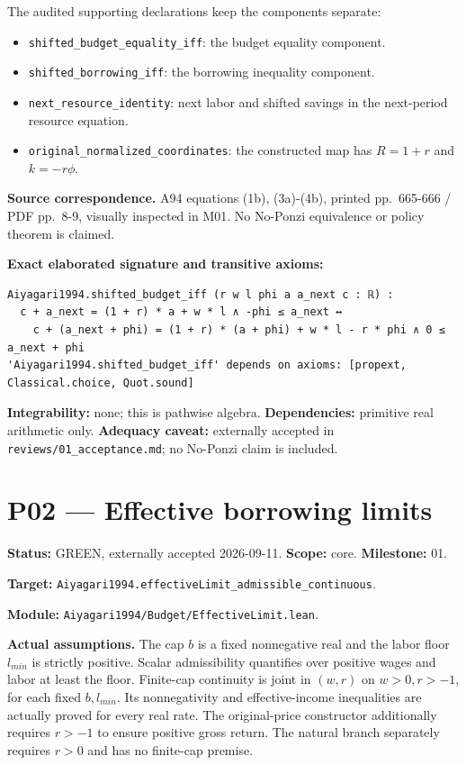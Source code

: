 \documentclass[
  11pt,
]{article}
\providecommand{\tightlist}{%
  \setlength{\itemsep}{0pt}\setlength{\parskip}{0pt}}
\let\LedgerOriginalTexttt\texttt
\renewcommand{\texttt}[1]{{\small\LedgerOriginalTexttt{#1}}}
\begin{document}
The audited supporting declarations keep the components separate:

\begin{itemize}
\tightlist
\item
  \texttt{shifted\_budget\_equality\_iff}: the budget equality
  component.
\item
  \texttt{shifted\_borrowing\_iff}: the borrowing inequality component.
\item
  \texttt{next\_resource\_identity}: next labor and shifted savings in
  the next-period resource equation.
\item
  \texttt{original\_normalized\_coordinates}: the constructed map has
  \(R=1+r\) and \(k=-r\phi\).
\end{itemize}

\textbf{Source correspondence.} A94 equations (1b), (3a)-(4b), printed
pp.~665-666 / PDF pp.~8-9, visually inspected in M01. No No-Ponzi
equivalence or policy theorem is claimed.

\textbf{Exact elaborated signature and transitive axioms:}

\begin{verbatim}
Aiyagari1994.shifted_budget_iff (r w l phi a a_next c : ℝ) :
  c + a_next = (1 + r) * a + w * l ∧ -phi ≤ a_next ↔
    c + (a_next + phi) = (1 + r) * (a + phi) + w * l - r * phi ∧ 0 ≤ a_next + phi
'Aiyagari1994.shifted_budget_iff' depends on axioms: [propext, Classical.choice, Quot.sound]
\end{verbatim}

\textbf{Integrability:} none; this is pathwise algebra.
\textbf{Dependencies:} primitive real arithmetic only. \textbf{Adequacy
caveat:} externally accepted in \texttt{reviews/01\_acceptance.md}; no
No-Ponzi claim is included.

\section{P02 --- Effective borrowing
limits}\label{p02-effective-borrowing-limits}

\textbf{Status:} GREEN, externally accepted 2026-09-11. \textbf{Scope:}
core. \textbf{Milestone:} 01.

\textbf{Target:}
\texttt{Aiyagari1994.effectiveLimit\_admissible\_continuous}.

\textbf{Module:} \texttt{Aiyagari1994/Budget/EffectiveLimit.lean}.

\textbf{Actual assumptions.} The cap \(b\) is a fixed nonnegative real
and the labor floor \(l_{min}\) is strictly positive. Scalar
admissibility quantifies over positive wages and labor at least the
floor. Finite-cap continuity is joint in \((w,r)\) on \(w>0,r>-1\), for
each fixed \(b,l_{min}\). Its nonnegativity and effective-income
inequalities are actually proved for every real rate. The original-price
constructor additionally requires \(r>-1\) to ensure positive gross
return. The natural branch separately requires \(r>0\) and has no
finite-cap premise.
\end{document}
